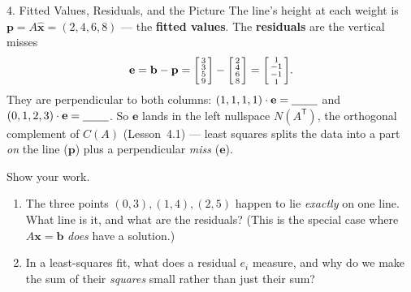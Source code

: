 \documentclass[10pt]{article}
\newcommand{\xx}{\mathbf{x}}
\newcommand{\bb}{\mathbf{b}}
\newcommand{\pp}{\mathbf{p}}
\newcommand{\ee}{\mathbf{e}}
\newcommand{\T}{\mathsf{T}}
\begin{document}
\begin{notesbox}{4. Fitted Values, Residuals, and the Picture}
The line's height at each weight is $\pp=A\hat{\xx}=(2,4,6,8)$ --- the \textbf{fitted values}. The
\textbf{residuals} are the vertical misses
\[
  \ee=\bb-\pp=\begin{bsmallmatrix} 3\\3\\5\\9 \end{bsmallmatrix}-\begin{bsmallmatrix} 2\\4\\6\\8 \end{bsmallmatrix}
  =\begin{bsmallmatrix} 1\\-1\\-1\\1 \end{bsmallmatrix}.
\]
They are perpendicular to both columns: $(1,1,1,1)\cdot\ee=\blank{0.8cm}$ and
$(0,1,2,3)\cdot\ee=\blank{0.8cm}$. So $\ee$ lands in the left nullspace $N(A^{\T})$, the orthogonal
complement of $C(A)$ (Lesson~4.1) --- least squares splits the data into a part \emph{on} the line
($\pp$) plus a perpendicular \emph{miss} ($\ee$).

\begin{center}
\end{center}
\end{notesbox}

\begin{practicebox}
Show your work.
\begin{enumerate}[leftmargin=1.6em, itemsep=6pt]
  \item The three points $(0,3),(1,4),(2,5)$ happen to lie \emph{exactly} on one line. What line is it,
        and what are the residuals? (This is the special case where $A\xx=\bb$ \emph{does} have a
        solution.) \writeline
  \item In a least-squares fit, what does a residual $e_i$ measure, and why do we make the sum of their
        \emph{squares} small rather than just their sum? \writeline
\end{enumerate}
\end{practicebox}
\end{document}
